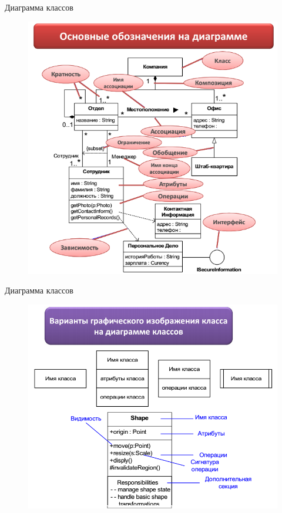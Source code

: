 \documentclass{beamer}
\begin{document}
\begin{frame}[t]{Диаграмма классов}
\begin{figure}[h]
\centering
\includegraphics[scale=0.45]{images/lec03-pic18.png}
\end{figure}
\end{frame}

\begin{frame}[t]{Диаграмма классов}
\begin{figure}[h]
\centering
\includegraphics[scale=0.45]{images/lec03-pic19.png}
\end{figure}
\end{frame}
\end{document}
